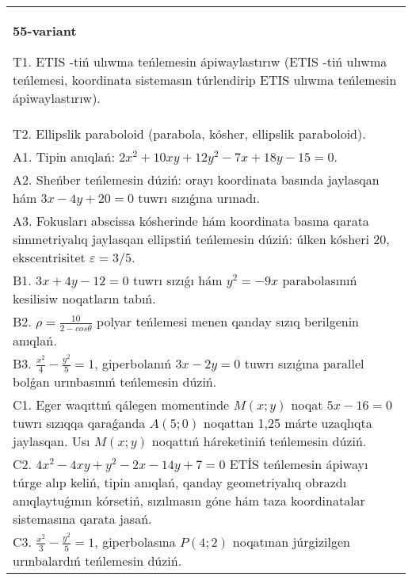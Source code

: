 \documentclass{article}
\begin{document}
\begin{tabular}{m{17cm}}
\textbf{55-variant}
\newline

T1. ETIS -tiń ulıwma teńlemesin ápiwaylastırıw (ETIS -tiń ulıwma teńlemesi, koordinata sistemasın túrlendirip ETIS ulıwma teńlemesin ápiwaylastırıw).\\

T2. Ellipslik paraboloid (parabola, kósher, ellipslik paraboloid).\\

A1. Tipin anıqlań: $2 x^{2}+10 xy+12 y^{2}-7 x+18 y-15=0$.\\

A2. Sheńber teńlemesin dúziń: orayı koordinata basında jaylasqan hám $3 x-4 y+20=0$ tuwrı sızıǵına urınadı.\\

A3. Fokusları abscissa kósherinde hám koordinata basına qarata simmetriyalıq jaylasqan ellipstiń teńlemesin dúziń: úlken kósheri $20$, ekscentrisitet $\varepsilon=3/5$.\\

B1. $3x + 4y - 12 = 0$ tuwrı sızıǵı hám $y^{2} = - 9x$ parabolasınıń kesilisiw noqatların tabıń.  \\

B2. $\rho = \frac{10}{2 - cos\theta}$ polyar teńlemesi menen qanday sızıq berilgenin anıqlań.  \\

B3. $\frac{x^{2}}{4} - \frac{y^{2}}{5} = 1$, giperbolanıń $3x - 2y = 0$ tuwrı sızıǵına parallel bolǵan urınbasınıń teńlemesin dúziń.  \\

C1. Eger waqıttıń qálegen momentinde $M(x;y)$ noqat $5x - 16 = 0$ tuwrı sızıqqa qaraǵanda $A(5;0)$ noqattan 1,25 márte uzaqlıqta jaylasqan. Usı $M(x;y)$ noqattıń háreketiniń teńlemesin dúziń.  \\

C2. $4x^{2} - 4xy + y^{2} - 2x - 14y + 7 = 0$ ETİS teńlemesin ápiwayı túrge alıp keliń, tipin anıqlań, qanday geometriyalıq obrazdı anıqlaytuǵının kórsetiń, sızılmasın góne hám taza koordinatalar sistemasına qarata jasań.  \\

C3. $\frac{x^{2}}{3} - \frac{y^{2}}{5} = 1$, giperbolasına $P(4;2)$ noqatınan júrgizilgen urınbalardıń teńlemesin dúziń.  \\

\end{tabular}
\vspace{1cm}
\end{document}
